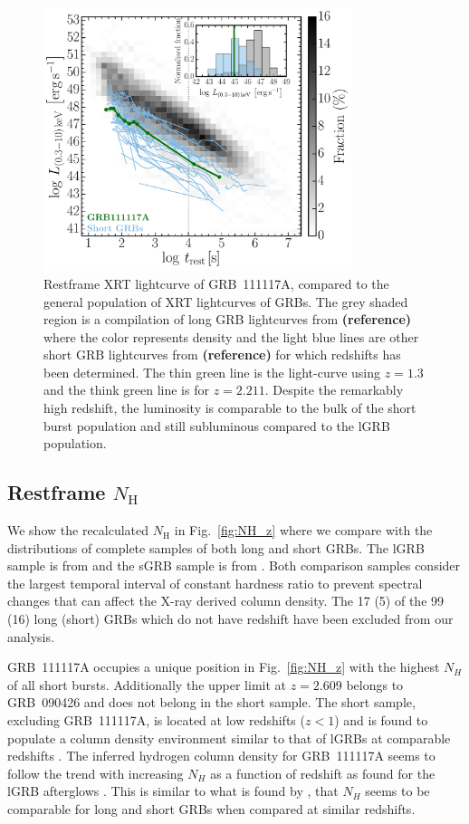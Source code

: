 \documentclass{aa}    %
\newcommand\todo[1]{\textbf{(#1)}}
\begin{document}
\begin{figure}
	\centering
	\includegraphics[width=9cm]{figures/XLC_111117A_rest.pdf}
	\caption{Restframe XRT lightcurve of GRB~111117A, compared to the general population of XRT lightcurves of GRBs. The grey shaded region is a compilation of long GRB lightcurves from \todo{reference} where the color represents density and the light blue lines are other short GRB lightcurves from \todo{reference} for which redshifts has been determined. The thin green line is the light-curve using $z = 1.3$ and the think green line is for $z = 2.211$. Despite the remarkably high redshift, the luminosity is comparable to the bulk of the short burst population and still subluminous compared to the lGRB population.}
	\label{fig:sxray_lightcurve}
\end{figure}

\subsection{Restframe $N_\mathrm{H}$} \label{restnH}

We show the recalculated $N_\mathrm{H}$ in Fig.~\ref{fig:NH_z} where we compare
with the distributions of complete samples of both long and short GRBs. The lGRB
sample is from \citet{Arcodia2016} and the sGRB sample is from
\citet{DAvanzo2014a}. Both comparison samples consider the largest temporal
interval of constant hardness ratio to prevent spectral changes that can affect
the X-ray derived column density. The 17 (5) of the 99 (16) long (short) GRBs
which do not have redshift have been excluded from our analysis.

GRB~111117A occupies a unique position in Fig.~\ref{fig:NH_z} with the highest
$N_H$ of all short bursts. Additionally the upper limit at $z = 2.609$ belongs
to GRB~090426 and does not belong in the short sample. The short sample,
excluding GRB~111117A, is located at low redshifts ($z < 1$) and is found to
populate a column density environment similar to that of lGRBs at comparable
redshifts \citep{DAvanzo2014a}. The inferred hydrogen column density for
GRB~111117A seems to follow the trend with increasing $N_H$ as a function of
redshift as found for the lGRB afterglows \citep{Arcodia2016}. This is similar
to what is found by \citet{Kopac2012, Margutti2013}, that $N_H$ seems to be
comparable for long and short GRBs when compared at similar redshifts.
\end{document}
